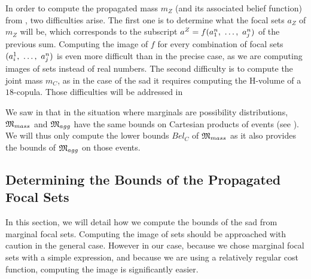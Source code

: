 In order to compute the propagated mass $m_Z$ (and its associated belief function) from , two difficulties arise. The first one is to determine what the focal sets $a_Z$ of $m_Z$ will be, which corresponds to the subscript $a^Z=f(a^n_1 , ~\ldots, ~  a^n_j)$ of the previous sum. Computing the image of $f$ for every combination of focal sets $(a^1_i , ~\ldots, ~ a^n_j)$ is even more difficult than in the precise case, as we are computing images of sets instead of real numbers. The second difficulty is to compute the joint mass $m_C$, as in the case of the \acrshort{sad} it requires computing the H-volume of a $18$-copula. Those difficulties will be addressed in 

We saw in  that in the situation where marginals are possibility distributions, $\mathfrak{M}_{mass}$ and $\mathfrak{M}_{agg}$ have the same bounds on Cartesian products of events (see ). We will thus only compute the lower bounds $Bel_C$ of $\mathfrak{M}_{mass}$ as it also provides the bounds of $\mathfrak{M}_{agg}$ on those events.

\subsection{Determining the Bounds of the Propagated Focal Sets}\label{sec:propagated_focal_sets}
In this section, we will detail how we compute the bounds of the \acrshort{sad} from marginal focal sets. Computing the image of sets should be approached with caution in the general case. However in our case, because we chose marginal focal sets with a simple expression, and because we are using a relatively regular cost function, computing the image is significantly easier.

